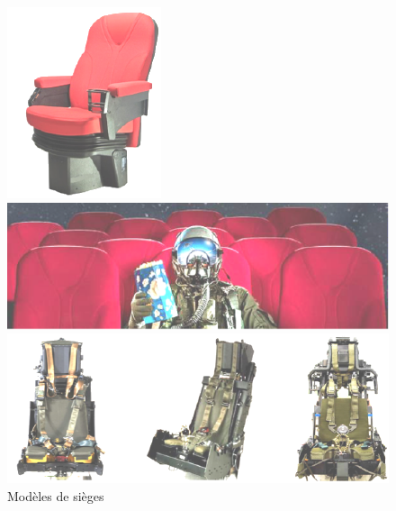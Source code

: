 \begin{figure}[!ht]
\begin{minipage}{0.35\linewidth}
 \centering\includegraphics[width=0.8\linewidth]{img/img01a}
\end{minipage}\hfill
\begin{minipage}{0.55\linewidth}
 \centering\includegraphics[width=1\linewidth]{img/img01b}
\end{minipage}

\begin{center}
 \includegraphics[width=0.8\linewidth]{img/img01c}
\end{center}
\caption{Modèles de sièges}
\label{fig1}
\end{figure}


